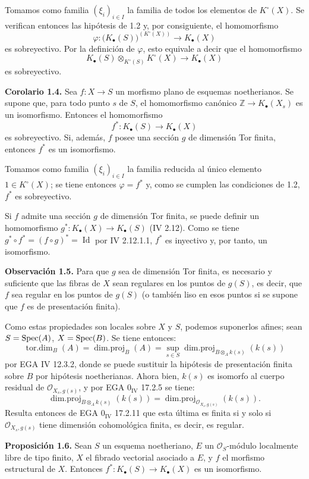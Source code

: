 Tomamos como familia $(\xi_i)_{i\in I}$ la familia de todos los elementos de $K^\circ(X)$. Se verifican entonces las hipótesis de 1.2 y, por consiguiente, el homomorfismo
\[
\varphi:\bigl(K_\bullet(S)\bigr)^{(K^\circ(X))}\longrightarrow K_\bullet(X)
\]
es sobreyectivo. Por la definición de $\varphi$, esto equivale a decir que el homomorfismo
\[
K_\bullet(S)\otimes_{K^\circ(S)}K^\circ(X)\longrightarrow K_\bullet(X)
\]
es sobreyectivo.

\textbf{Corolario 1.4.} Sea $f:X\to S$ un morfismo plano de esquemas noetherianos. Se supone que, para todo punto $s$ de $S$, el homomorfismo canónico $\mathbb Z\to K_\bullet(X_s)$ es un isomorfismo. Entonces el homomorfismo
\[
f^*:K_\bullet(S)\longrightarrow K_\bullet(X)
\]
es sobreyectivo. Si, además, $f$ posee una sección $g$ de dimensión Tor finita, entonces $f^*$ es un isomorfismo.

Tomamos como familia $(\xi_i)_{i\in I}$ la familia reducida al único elemento $1\in K^\circ(X)$; se tiene entonces $\varphi=f^*$ y, como se cumplen las condiciones de 1.2, $f^*$ es sobreyectivo.

Si $f$ admite una sección $g$ de dimensión Tor finita, se puede definir un homomorfismo $g^*:K_\bullet(X)\to K_\bullet(S)$ (IV 2.12). Como se tiene $g^*\circ f^*=(f\circ g)^*=\operatorname{Id}$ por IV 2.12.1.1, $f^*$ es inyectivo y, por tanto, un isomorfismo.

\textbf{Observación 1.5.} Para que $g$ sea de dimensión Tor finita, es necesario y suficiente que las fibras de $X$ sean regulares en los puntos de $g(S)$, es decir, que $f$ sea regular en los puntos de $g(S)$ (o también liso en esos puntos si se supone que $f$ es de presentación finita).

Como estas propiedades son locales sobre $X$ y $S$, podemos suponerlos afines; sean $S=\operatorname{Spec}(A)$, $X=\operatorname{Spec}(B)$. Se tiene entonces:
\[
\operatorname{tor.dim}_B(A)=\operatorname{dim.proj}_B(A)=\sup_{s\in S}\operatorname{dim.proj}_{B\otimes_A k(s)}(k(s))
\]
por EGA IV 12.3.2, donde se puede sustituir la hipótesis de presentación finita sobre $B$ por hipótesis noetherianas. Ahora bien, $k(s)$ es isomorfo al cuerpo residual de $\mathcal O_{X_s,g(s)}$, y por EGA $0_{\mathrm{IV}}$ 17.2.5 se tiene:
\[
\operatorname{dim.proj}_{B\otimes_A k(s)}(k(s))=
\operatorname{dim.proj}_{\mathcal O_{X_s,g(s)}}(k(s)).
\]
Resulta entonces de EGA $0_{\mathrm{IV}}$ 17.2.11 que esta última es finita si y solo si $\mathcal O_{X_s,g(s)}$ tiene dimensión cohomológica finita, es decir, es regular.

\textbf{Proposición 1.6.} Sean $S$ un esquema noetheriano, $E$ un $\mathcal O_S$-módulo localmente libre de tipo finito, $X$ el fibrado vectorial asociado a $E$, y $f$ el morfismo estructural de $X$. Entonces \(f^*:K_\bullet(S)\longrightarrow K_\bullet(X)\) es un isomorfismo.

